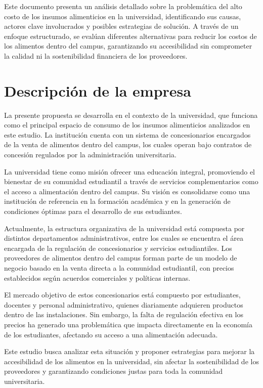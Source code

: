 \documentclass[letterpaper, 11pt]{report}
\begin{document}
Este documento presenta un análisis detallado sobre la problemática del alto
costo de los insumos alimenticios en la universidad, identificando sus causas,
actores clave involucrados y posibles estrategias de solución. A través de un
enfoque estructurado, se evalúan diferentes alternativas para reducir los
costos de los alimentos dentro del campus, garantizando su accesibilidad sin
comprometer la calidad ni la sostenibilidad financiera de los proveedores.

\section{Descripción de la empresa}

La presente propuesta se desarrolla en el contexto de la universidad, que
funciona como el principal espacio de consumo de los insumos alimenticios
analizados en este estudio. La institución cuenta con un sistema de
concesionarios encargados de la venta de alimentos dentro del campus, los
cuales operan bajo contratos de concesión regulados por la administración
universitaria.

La universidad tiene como misión ofrecer una educación integral, promoviendo el
bienestar de su comunidad estudiantil a través de servicios complementarios
como el acceso a alimentación dentro del campus. Su visión es consolidarse como
una institución de referencia en la formación académica y en la generación de
condiciones óptimas para el desarrollo de sus estudiantes.

Actualmente, la estructura organizativa de la universidad está compuesta por
distintos departamentos administrativos, entre los cuales se encuentra el área
encargada de la regulación de concesionarios y servicios estudiantiles. Los
proveedores de alimentos dentro del campus forman parte de un modelo de negocio
basado en la venta directa a la comunidad estudiantil, con precios establecidos
según acuerdos comerciales y políticas internas.

El mercado objetivo de estos concesionarios está compuesto por estudiantes,
docentes y personal administrativo, quienes diariamente adquieren productos
dentro de las instalaciones. Sin embargo, la falta de regulación efectiva en
los precios ha generado una problemática que impacta directamente en la
economía de los estudiantes, afectando su acceso a una alimentación adecuada.

Este estudio busca analizar esta situación y proponer estrategias para mejorar
la accesibilidad de los alimentos en la universidad, sin afectar la
sostenibilidad de los proveedores y garantizando condiciones justas para toda
la comunidad universitaria.
\end{document}
